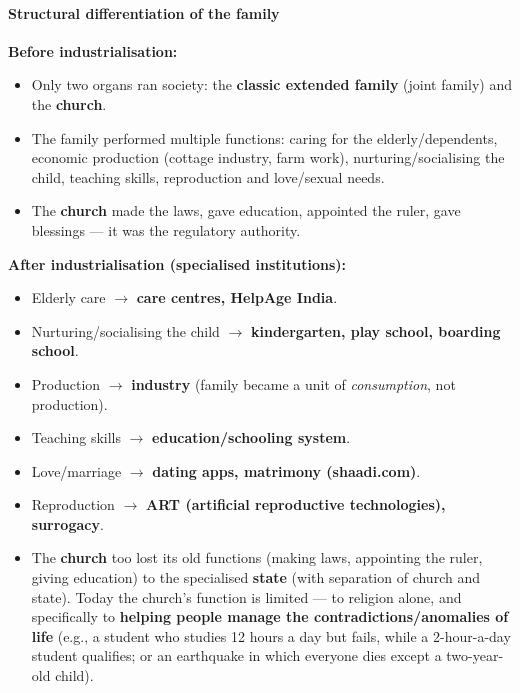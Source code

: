 \paragraph{Structural differentiation of the family}

\begin{ExampleBox}
\textbf{Before industrialisation:}
\begin{itemize}
\item Only two organs ran society: the \textbf{classic extended family} (joint family) and the \textbf{church}.
\item The family performed multiple functions: caring for the elderly/dependents, economic production (cottage industry, farm work), nurturing/socialising the child, teaching skills, reproduction and love/sexual needs.
\item The \textbf{church} made the laws, gave education, appointed the ruler, gave blessings --- it was the regulatory authority.
\end{itemize}
\end{ExampleBox}

\begin{ExampleBox}
\textbf{After industrialisation (specialised institutions):}
\begin{itemize}
\item Elderly care $\rightarrow$ \textbf{care centres, HelpAge India}.
\item Nurturing/socialising the child $\rightarrow$ \textbf{kindergarten, play school, boarding school}.
\item Production $\rightarrow$ \textbf{industry} (family became a unit of \textit{consumption}, not production).
\item Teaching skills $\rightarrow$ \textbf{education/schooling system}.
\item Love/marriage $\rightarrow$ \textbf{dating apps, matrimony (shaadi.com)}.
\item Reproduction $\rightarrow$ \textbf{ART (artificial reproductive technologies), surrogacy}.
\item The \textbf{church} too lost its old functions (making laws, appointing the ruler, giving education) to the specialised \textbf{state} (with separation of church and state). Today the church's function is limited --- to religion alone, and specifically to \textbf{helping people manage the contradictions/anomalies of life} (e.g., a student who studies 12 hours a day but fails, while a 2-hour-a-day student qualifies; or an earthquake in which everyone dies except a two-year-old child).
\end{itemize}
\end{ExampleBox}

